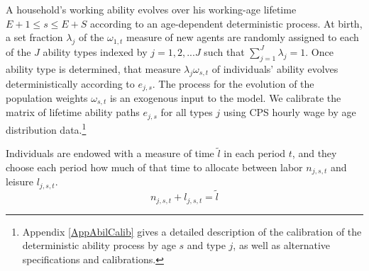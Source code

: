 \documentclass[letterpaper,12pt]{article}
\theoremstyle{definition}
\begin{document}
\begin{spacing}{1.5}
    A household's working ability evolves over his working-age lifetime $E+1\leq s \leq E+S$ according to an age-dependent deterministic process. At birth, a set fraction $\lambda_j$ of the $\omega_{1,t}$ measure of new agents are randomly assigned to each of the $J$ ability types indexed by $j=1,2,...J$ such that $\sum_{j=1}^J\lambda_j=1$. Once ability type is determined, that measure $\lambda_j\omega_{s,t}$ of individuals' ability evolves deterministically according to $e_{j,s}$. The process for the evolution of the population weights $\omega_{s,t}$ is an exogenous input to the model. We calibrate the matrix of lifetime ability paths $e_{j,s}$ for all types $j$ using CPS hourly wage by age distribution data.\footnote{Appendix \ref{AppAbilCalib} gives a detailed description of the calibration of the deterministic ability process by age $s$ and type $j$, as well as alternative specifications and calibrations.}

    Individuals are endowed with a measure of time $\tilde{l}$ in each period $t$, and they choose each period how much of that time to allocate between labor $n_{j,s,t}$ and leisure $l_{j,s,t}$.
    \begin{equation}\label{EqLabConstr}
      n_{j,s,t} + l_{j,s,t} = \tilde{l}
    \end{equation}


\end{spacing}
\end{document}
